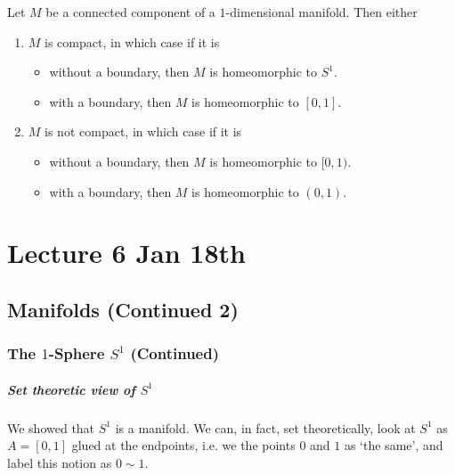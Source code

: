 \documentclass[notoc,notitlepage]{tufte-book}
\begin{document}
\begin{thm}\label{thm:_1_dimensional_manifolds_determined_by_its_compactness}
  Let $M$ be a connected component of a $1$-dimensional manifold. Then either
  \begin{enumerate}
    \item $M$ is compact, in which case if it is
      \begin{itemize}
        \item without a boundary, then $M$ is homeomorphic to $S^1$.
        \item with a boundary, then $M$ is homeomorphic to $[0, 1]$.
      \end{itemize}
    \item $M$ is not compact, in which case if it is
      \begin{itemize}
        \item without a boundary, then $M$ is homeomorphic to $[0, 1)$.
        \item with a boundary, then $M$ is homeomorphic to $(0, 1)$.
      \end{itemize}
  \end{enumerate}
\end{thm}




\chapter{Lecture 6 Jan 18th}%
\label{chp:lecture_6_jan_18th}

\section{Manifolds (Continued 2)}%
\label{sec:manifolds_continued_2}

\subsection{The $1$-Sphere $S^1$ (Continued)}%
\label{sub:the_1_sphere_s_1_continued}

\paragraph{Set theoretic view of $S^1$}
We showed that $S^1$ is a manifold. We can, in fact, set theoretically, look
at $S^1$ as $A = [0, 1]$ glued at the endpoints, i.e. we 
the points $0$ and $1$ as `the same', and label this notion as $0 \sim 1$.
\end{document}
